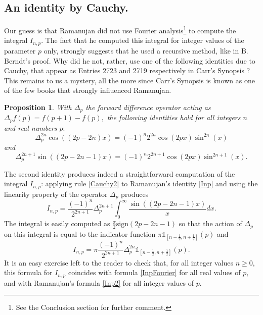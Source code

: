 \documentclass[11pt,oneside,reqno]{article}
\newtheorem*{proposition}{Proposition}
\theoremstyle{definition}
\begin{document}
\subsection{An identity by Cauchy.}
Our guess is that Ramanujan did not use Fourier analysis\footnote{See the  Conclusion section for further comment.} to compute the integral $I_{n,p}$.  The fact that he computed this  integral for integer values of the parameter $p$ only, strongly suggests that he used a recursive method, like in B. Berndt's proof. 
Why did he not, rather, use one of the following identities due to Cauchy, that appear as Entries 2723 and 2719 respectively  in Carr's Synopsis \cite{Carr}? This remains to us a mystery, all the more since Carr's Synopsis is known as one of the few books that strongly influenced Ramanujan.  
\begin{proposition}
With $\Delta_p$ the forward difference operator acting as $\Delta_p f(p)=f(p+1)-f(p),$ the following identities hold for all integers $n$ and real numbers $p:$
\begin{equation}
\Delta_p^{2n} \cos \left(
\left(2p-2n
\right)x\right) = (-1)^n 2^{2n} \cos\left(2px\right)\sin^{2n}\left(x\right)    
\end{equation}
and
\begin{equation}
\label{Cauchy2}
\Delta_p^{2n+1} \sin \left(
\left(2p-2n-1
\right)x\right) = (-1)^n 2^{2n+1} \cos(2px) \sin^{2n+1}\left(x\right).
\end{equation}
\end{proposition}
The second identity produces indeed a straightforward computation of the integral $I_{n,p}$:
applying rule \eqref{Cauchy2} to Ramanujan's  identity \eqref{Inp} and using the linearity property of the operator $\Delta_p$ produces
\begin{equation}
I_{n,p}=\frac{(-1)^n}{ 2^{2n+1}}
\Delta_p^{2n+1} \int_{0}^{\infty}
\frac{\sin \left(
\left(2p-2n-1
\right)x\right)}{x}dx. 
\end{equation}
The integral is easily computed as $\frac{\pi}{2}  \text{sign} (2p-2n-1)$ so that the action of $\Delta_p$ on this integral is equal to the indicator function $\pi  \mathds{1}_{\left[n-\frac{1}{2},n+\frac{1}{2}\right]}(p)$ and
\begin{equation}
I_{n,p} = \pi\frac{(-1)^n}{ 2^{2n+1}}
\Delta_p^{2n}   \mathds{1}_{\left[n-\frac{1}{2},n+\frac{1}{2}\right]}(p).
\end{equation}
It is an easy exercise left to the reader to check that, for all integer values $n \ge 0,$ this formula for $I_{n,p}$ coincides with formula \eqref{InpFourier} for all real values of $p,$ and with Ramanujan's formula \eqref{Inp2} for all integer values of $p.$
\end{document}
